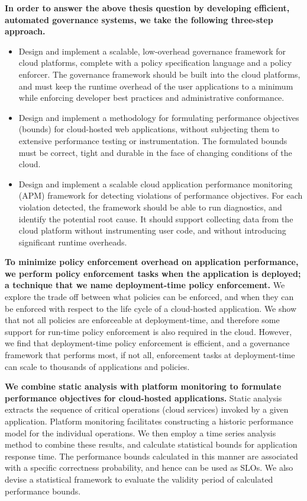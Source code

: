 \textbf{In order to answer the above thesis question by developing efficient, automated governance systems,
we take the following three-step approach.}
\begin{itemize}
\item Design and implement a scalable, low-overhead governance framework for cloud platforms,
complete with a policy specification language and a policy enforcer. The governance framework should be
built into the cloud platforms, and must
keep the runtime overhead of the user applications to a minimum while enforcing
developer best practices and administrative conformance.
\item Design and implement a methodology for formulating performance objectives (bounds)
for cloud-hosted web applications, without
 subjecting them to extensive performance testing or instrumentation. The formulated
bounds must be correct, tight and durable in the face of changing conditions of the cloud.
 \item Design and implement a scalable cloud application performance monitoring (APM) framework for detecting
violations of performance objectives. For each
violation detected, the framework should be able to run diagnostics, and identify the potential
root cause. It should support collecting data from the cloud platform
 without instrumenting user code, and without introducing significant runtime overheads.
\end{itemize}

\textbf{To minimize policy enforcement overhead on application performance,
we perform policy enforcement tasks when the application is deployed; a technique that we
name deployment-time policy enforcement.} 
We explore the
trade off between what policies can be enforced, and when they can be enforced with respect
to the life cycle of a cloud-hosted application. 
We show that not all policies
are enforceable at deployment-time, and therefore some support for run-time policy enforcement
is also required in the cloud. However, we find that
deployment-time policy enforcement is efficient, and a governance framework that
performs most, if not all, enforcement tasks at deployment-time can scale
to thousands of applications and policies.

\textbf{We combine static analysis with platform monitoring to formulate performance objectives for
cloud-hosted applications.} Static analysis
extracts the sequence of critical operations (cloud services) invoked by a given application.
Platform monitoring facilitates constructing a historic performance model for the individual operations.
We then employ a time series analysis method to combine these results, and calculate statistical bounds 
for application response time. The performance bounds calculated in this manner
are associated with a specific correctness probability, and hence can be used
as SLOs. We also devise a statistical framework to evaluate the validity period of 
calculated performance bounds.

